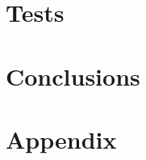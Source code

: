 \part{Tests}\label{pt:tests} 
\part{Conclusions}\label{pt:conclusions} 
%

\glsresetall
\appendix %

 \graphicspath{{figures/appendix/}}
\part{Appendix}\label{pt:appendix}




